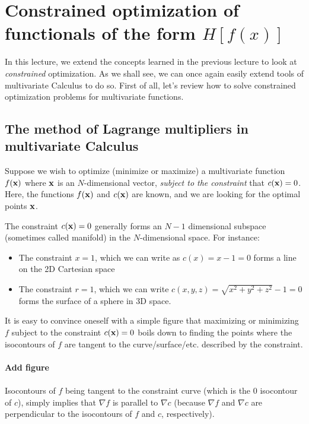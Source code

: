 \section{Constrained optimization of functionals of the form $H[f(x)]$}

In this lecture, we extend the concepts learned in the previous lecture to look at {\it constrained} optimization. As we shall see, we can once again easily extend tools of multivariate Calculus to do so. First of all, let's review how to solve constrained optimization problems for multivariate functions.

\subsection{The method of Lagrange multipliers in multivariate Calculus}

Suppose we wish to optimize (minimize or maximize) a multivariate function $f({\bf x})$ where ${\bf x}$ is an $N$-dimensional vector, {\it subject to the constraint} that $c({\bf x}) = 0$. Here, the functions $f({\bf x})$ and $c({\bf x})$ are known, and we are looking for the optimal points ${\bf x}$. 

The constraint $c({\bf x}) = 0$ generally forms an $N-1$ dimensional subspace (sometimes called manifold) in the $N$-dimensional space. For instance:
\begin{itemize}
    \item The constraint $x=1$, which we can write as $c(x) = x-1 = 0$ forms a line on the 2D Cartesian space
    \item The constraint $r =1$, which we can write $c(x,y,z) = \sqrt{x^2+y^2+z^2} -1 = 0$ forms the surface of a sphere in 3D space. 
\end{itemize}

It is easy to convince oneself with a simple figure that maximizing or minimizing $f$ subject to the constraint $c({\bf x}) = 0$  boils down to finding the points where the isocontours of $f$ are tangent to the curve/surface/etc. described by the constraint. 
\\
\\
{\color{red} {\bf Add figure}}
\\
\\
Isocontours of $f$ being tangent to the constraint curve (which is the 0 isocontour of $c$), simply implies that $\nabla f$ is parallel to $\nabla c$ (because $\nabla f$ and $\nabla c$ are perpendicular to the isocontours of $f$ and $c$, respectively). 

